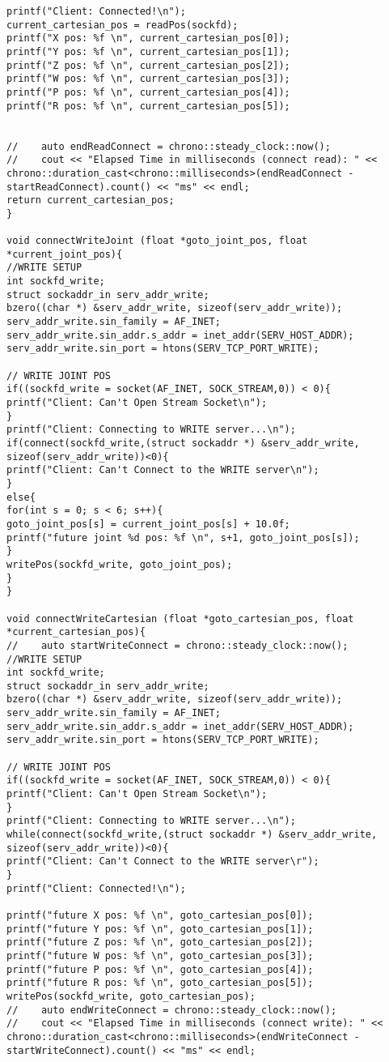 \begin{lstlisting}[frame = single, label={lst:cppread1}]
printf("Client: Connected!\n");
current_cartesian_pos = readPos(sockfd);
printf("X pos: %f \n", current_cartesian_pos[0]);
printf("Y pos: %f \n", current_cartesian_pos[1]);
printf("Z pos: %f \n", current_cartesian_pos[2]);
printf("W pos: %f \n", current_cartesian_pos[3]);
printf("P pos: %f \n", current_cartesian_pos[4]);
printf("R pos: %f \n", current_cartesian_pos[5]);


//    auto endReadConnect = chrono::steady_clock::now();
//    cout << "Elapsed Time in milliseconds (connect read): " << chrono::duration_cast<chrono::milliseconds>(endReadConnect - startReadConnect).count() << "ms" << endl;
return current_cartesian_pos;
}

void connectWriteJoint (float *goto_joint_pos, float *current_joint_pos){
//WRITE SETUP
int sockfd_write;
struct sockaddr_in serv_addr_write;
bzero((char *) &serv_addr_write, sizeof(serv_addr_write));
serv_addr_write.sin_family = AF_INET;
serv_addr_write.sin_addr.s_addr = inet_addr(SERV_HOST_ADDR);
serv_addr_write.sin_port = htons(SERV_TCP_PORT_WRITE);

// WRITE JOINT POS
if((sockfd_write = socket(AF_INET, SOCK_STREAM,0)) < 0){
printf("Client: Can't Open Stream Socket\n");
}
printf("Client: Connecting to WRITE server...\n");
if(connect(sockfd_write,(struct sockaddr *) &serv_addr_write, sizeof(serv_addr_write))<0){
printf("Client: Can't Connect to the WRITE server\n");
}
else{
for(int s = 0; s < 6; s++){
goto_joint_pos[s] = current_joint_pos[s] + 10.0f;
printf("future joint %d pos: %f \n", s+1, goto_joint_pos[s]);
}
writePos(sockfd_write, goto_joint_pos);
}
}

void connectWriteCartesian (float *goto_cartesian_pos, float *current_cartesian_pos){
//    auto startWriteConnect = chrono::steady_clock::now();
//WRITE SETUP
int sockfd_write;
struct sockaddr_in serv_addr_write;
bzero((char *) &serv_addr_write, sizeof(serv_addr_write));
serv_addr_write.sin_family = AF_INET;
serv_addr_write.sin_addr.s_addr = inet_addr(SERV_HOST_ADDR);
serv_addr_write.sin_port = htons(SERV_TCP_PORT_WRITE);

// WRITE JOINT POS
if((sockfd_write = socket(AF_INET, SOCK_STREAM,0)) < 0){
printf("Client: Can't Open Stream Socket\n");
}
printf("Client: Connecting to WRITE server...\n");
while(connect(sockfd_write,(struct sockaddr *) &serv_addr_write, sizeof(serv_addr_write))<0){
printf("Client: Can't Connect to the WRITE server\r");
}
printf("Client: Connected!\n");

printf("future X pos: %f \n", goto_cartesian_pos[0]);
printf("future Y pos: %f \n", goto_cartesian_pos[1]);
printf("future Z pos: %f \n", goto_cartesian_pos[2]);
printf("future W pos: %f \n", goto_cartesian_pos[3]);
printf("future P pos: %f \n", goto_cartesian_pos[4]);
printf("future R pos: %f \n", goto_cartesian_pos[5]);
writePos(sockfd_write, goto_cartesian_pos);
//    auto endWriteConnect = chrono::steady_clock::now();
//    cout << "Elapsed Time in milliseconds (connect write): " << chrono::duration_cast<chrono::milliseconds>(endWriteConnect - startWriteConnect).count() << "ms" << endl;


\end{lstlisting}

